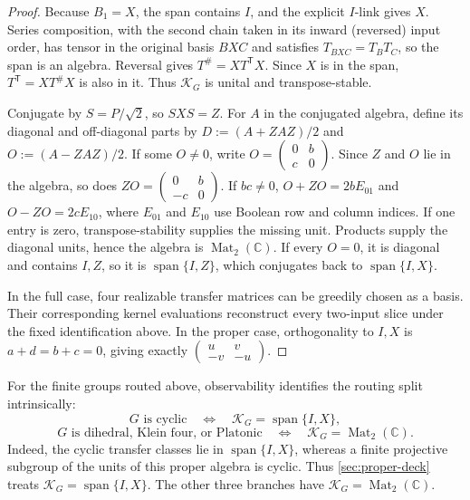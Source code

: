 \documentclass[11pt,letterpaper,onecolumn]{article}
\theoremstyle{plain}
\theoremstyle{definition}
\theoremstyle{remark}
\newcommand{\Mat}{\operatorname{Mat}}
\newcommand{\Span}{\operatorname{span}}
\begin{document}
\begin{proof}
Because \(B_1=X\), the span contains \(I\), and the explicit \(I\)-link
gives \(X\).  Series composition, with the second chain taken in its
inward (reversed) input order, has tensor in the original basis \(BXC\) and satisfies
\(T_{BXC}=T_BT_C\), so the span is an algebra.  Reversal gives
\(T^\#=XT^{\mathsf T}X\). Since \(X\) is in the span,
\(T^{\mathsf T}=XT^\#X\) is also in it.  Thus \(\mathscr K_G\) is unital
and transpose-stable.

Conjugate by \(S=P/\sqrt2\), so \(SXS=Z\).  For \(A\) in the conjugated algebra, define its diagonal
and off-diagonal parts by \(D:=(A+ZAZ)/2\) and \(O:=(A-ZAZ)/2\).  If some
\(O\ne0\), write
\(O=\left(\begin{smallmatrix}0&b\\c&0\end{smallmatrix}\right)\).  Since \(Z\)
and \(O\) lie in the algebra, so does
\(ZO=\left(\begin{smallmatrix}0&b\\-c&0\end{smallmatrix}\right)\).  If
\(bc\ne0\), \(O+ZO=2bE_{01}\) and \(O-ZO=2cE_{10}\), where \(E_{01}\)
and \(E_{10}\) use Boolean row and column indices. If one entry is zero,
transpose-stability supplies the missing unit.  Products supply the diagonal
units, hence the algebra is \(\Mat_2(\mathbb C)\).  If every \(O=0\), it is diagonal and contains \(I,Z\), so it is
\(\Span\{I,Z\}\), which conjugates back to \(\Span\{I,X\}\).

In the full case, four realizable transfer matrices can be greedily chosen as a
basis. Their corresponding kernel evaluations reconstruct every two-input slice
under the fixed identification above.  In the proper case, orthogonality to
\(I,X\) is \(a+d=b+c=0\), giving exactly
\(\left(\begin{smallmatrix}u&v\\-v&-u\end{smallmatrix}\right)\).
\end{proof}

For the finite groups routed above, observability identifies the routing split
intrinsically:
\[
 G\text{ is cyclic}
 \quad\Longleftrightarrow\quad
 \mathscr K_G=\Span\{I,X\},
\]
\[
 G\text{ is dihedral, Klein four, or Platonic}
 \quad\Longleftrightarrow\quad
 \mathscr K_G=\Mat_2(\mathbb C).
\]
Indeed, the cyclic transfer classes lie in \(\Span\{I,X\}\), whereas a
finite projective subgroup of the units of this proper algebra is cyclic.
Thus \cref{sec:proper-deck} treats \(\mathscr K_G=\Span\{I,X\}\).
The other three branches have \(\mathscr K_G=\Mat_2(\mathbb C)\).
\end{document}
